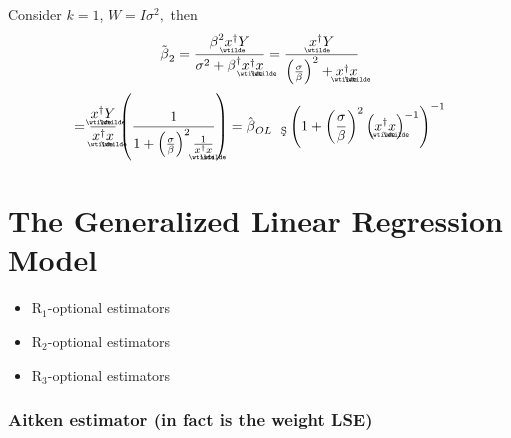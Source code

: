 \documentclass{article}
\begin{document}
Consider $k=1$, $W=I\sigma ^{2},$ then%
\begin{equation*}
\tilde{\beta}_{2}=\frac{\beta ^{2}%
\underaccent{\wtilde}{x}%
^{\dagger }Y}{\sigma ^{2}+\beta ^{\dagger }%
\underaccent{\wtilde}{x}%
^{\dagger }%
\underaccent{\wtilde}{x}%
}=\frac{%
\underaccent{\wtilde}{x}%
^{\dagger }Y}{\left( \frac{\sigma }{\beta }\right) ^{2}+%
\underaccent{\wtilde}{x}%
^{\dagger }%
\underaccent{\wtilde}{x}%
}
\end{equation*}%
\begin{equation*}
=\frac{%
\underaccent{\wtilde}{x}%
^{\dagger }%
\underaccent{\wtilde}{Y}%
}{%
\underaccent{\wtilde}{x}%
^{\dagger }%
\underaccent{\wtilde}{x}%
}\left( \frac{1}{1+\left( \frac{\sigma }{\beta }\right) ^{2}\frac{1}{%
\underaccent{\wtilde}{x}%
^{\dagger }%
\underaccent{\wtilde}{x}%
}}\right) =\hat{\beta}_{OL\text{\c{S}}}\left( 1+\left( \frac{\sigma }{\beta }%
\right) ^{2}\left( 
\underaccent{\wtilde}{x}%
^{\dagger }%
\underaccent{\wtilde}{x}%
\right) ^{-1}\right) ^{-1}
\end{equation*}

\bigskip 

\bigskip

\part{The Generalized Linear Regression Model}

\bigskip

\begin{itemize}
\item R$_{1}$-optional estimators

\item R$_{2}$-optional estimators

\item R$_{3}$-optional estimators
\end{itemize}

\section{Aitken estimator (in fact is the weight LSE)}
\end{document}
